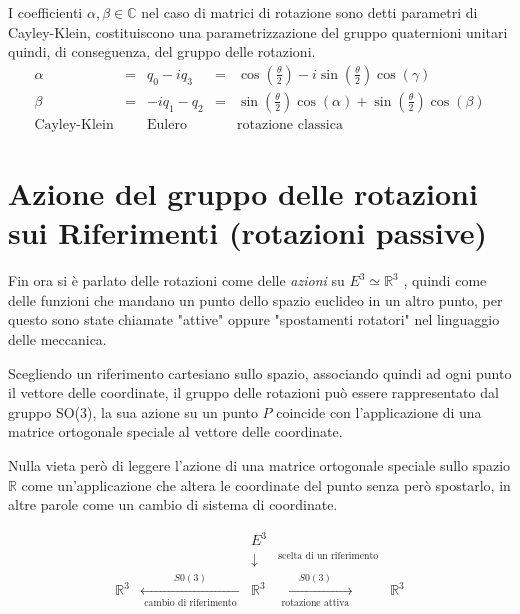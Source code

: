 \documentclass[11pt]{report}
\theoremstyle{plain}
\theoremstyle{definition}
\theoremstyle{remark}
\begin{document}
I coefficienti $\alpha, \beta \in \mathbb{C}$ nel caso di matrici di rotazione sono detti parametri di Cayley-Klein, costituiscono una parametrizzazione del gruppo quaternioni unitari quindi, di conseguenza, del gruppo delle rotazioni.
\begin{displaymath}
 \begin{array}{ccccc}
\alpha & = & q_{0} - i q_{3} & = & \cos(\frac{\theta}{2}) - i \sin(\frac{\theta}{2})\cos(\gamma)  \\
\beta & = & -i q_{1} - q_{2} & = & \sin(\frac{\theta}{2})\cos(\alpha) + \sin(\frac{\theta}{2})\cos(\beta)\\
\textrm{Cayley-Klein} & & \textrm{Eulero} & & \textrm{rotazione classica}
\end{array} 
\end{displaymath}




\section{Azione del gruppo delle rotazioni sui Riferimenti (rotazioni passive)}

Fin ora si è parlato delle rotazioni come delle \emph{azioni} su $ E^{3} \simeq \mathbb{R}^{3}$ , quindi come delle funzioni che mandano un punto dello spazio euclideo in un altro punto, per questo sono state chiamate "attive" oppure "spostamenti rotatori" nel linguaggio delle meccanica.

Scegliendo un riferimento cartesiano sullo spazio, associando quindi ad ogni punto il vettore delle coordinate,  il gruppo delle rotazioni può essere rappresentato dal gruppo SO(3), la sua azione su un punto $P$ coincide con l'applicazione di una matrice ortogonale speciale al vettore delle coordinate.

Nulla vieta però di leggere l'azione di una matrice ortogonale speciale sullo spazio $\mathbb{R}$ come un'applicazione che altera le coordinate del punto senza però spostarlo, in altre parole come un cambio di sistema di coordinate.

\begin{displaymath}
\begin{array}{ccccc}
 &  & E^{3} &  & \\
 & &\downarrow & ^{\textrm{scelta di un riferimento}}&\\
 \mathbb{R}^{3} &  \xleftarrow[\textrm{  cambio di riferimento  }]{S0(3)} & \mathbb{R}^{3} & \xrightarrow[\textrm{ rotazione attiva }]{S0(3)} & \mathbb{R}^{3}\\

\end{array}
\end{displaymath}
\end{document}

